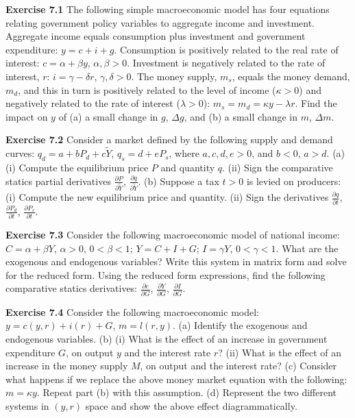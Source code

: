 \begin{original}
\textbf{Exercise 7.1} The following simple macroeconomic model has four equations relating government policy variables to aggregate income and investment. Aggregate income equals consumption plus investment and government expenditure: $y = c + i + g$. Consumption is positively related to the real rate of interest: $c = \alpha + \beta y$, $\alpha, \beta > 0$. Investment is negatively related to the rate of interest, $r$: $i = \gamma - \delta r$, $\gamma, \delta > 0$. The money supply, $m_s$, equals the money demand, $m_d$, and this in turn is positively related to the level of income ($\kappa > 0$) and negatively related to the rate of interest ($\lambda > 0$): $m_s = m_d = \kappa y - \lambda r$. Find the impact on $y$ of (a) a small change in $g$, $\Delta g$, and (b) a small change in $m$, $\Delta m$.

\textbf{Exercise 7.2} Consider a market defined by the following supply and demand curves: $q_d = a + bP_d + c\tilde{Y}$, $q_s = d + eP_s$, where $a, c, d, e > 0$, and $b < 0$, $a > d$. (a) (i) Compute the equilibrium price $P$ and quantity $q$. (ii) Sign the comparative statics partial derivatives $\frac{\partial P}{\partial \tilde{Y}}$, $\frac{\partial q}{\partial \tilde{Y}}$. (b) Suppose a tax $t > 0$ is levied on producers: (i) Compute the new equilibrium price and quantity. (ii) Sign the derivatives $\frac{\partial q}{\partial t}$, $\frac{\partial P_d}{\partial t}$, $\frac{\partial P_s}{\partial t}$.

\textbf{Exercise 7.3} Consider the following macroeconomic model of national income: $C = \alpha + \beta Y$, $\alpha > 0$, $0 < \beta < 1$; $Y = C + I + G$; $I = \gamma Y$, $0 < \gamma < 1$. What are the exogenous and endogenous variables? Write this system in matrix form and solve for the reduced form. Using the reduced form expressions, find the following comparative statics derivatives: $\frac{\partial c}{\partial G}$, $\frac{\partial Y}{\partial G}$, $\frac{\partial I}{\partial G}$.

\textbf{Exercise 7.4} Consider the following macroeconomic model: $y = c(y, r) + i(r) + G$, $m = l(r, y)$. (a) Identify the exogenous and endogenous variables. (b) (i) What is the effect of an increase in government expenditure $G$, on output $y$ and the interest rate $r$? (ii) What is the effect of an increase in the money supply $M$, on output and the interest rate? (c) Consider what happens if we replace the above money market equation with the following: $m = \kappa y$. Repeat part (b) with this assumption. (d) Represent the two different systems in $(y, r)$ space and show the above effect diagrammatically.


\end{original}
